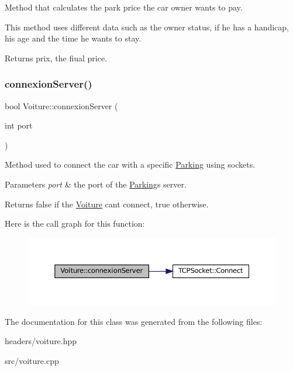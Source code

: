 Method that calculates the park price the car owner wants to pay. 

This method uses different data such as the owner status, if he has a handicap, his age and the time he wants to stay.

\begin{DoxyReturn}{Returns}
prix, the fiual price. 
\end{DoxyReturn}
\mbox{\label{class_voiture_abbc7a9f5a9e05a92b75623ff87bee85c}} 
\subsubsection{\texorpdfstring{connexion\+Server()}{connexionServer()}}
{\footnotesize\ttfamily bool Voiture\+::connexion\+Server (\begin{DoxyParamCaption}\item[{int}]{port }\end{DoxyParamCaption})}



Method used to connect the car with a specific \mbox{\hyperlink{class_parking}{Parking}} using sockets. 


\begin{DoxyParams}{Parameters}
{\em port} & the port of the \mbox{\hyperlink{class_parking}{Parking}}\textquotesingle{}s server. \\
\hline
\end{DoxyParams}
\begin{DoxyReturn}{Returns}
false if the \mbox{\hyperlink{class_voiture}{Voiture}} can\textquotesingle{}t connect, true otherwise. 
\end{DoxyReturn}
Here is the call graph for this function\+:
\nopagebreak
\begin{figure}[H]
\begin{center}
\leavevmode
\includegraphics[width=350pt]{class_voiture_abbc7a9f5a9e05a92b75623ff87bee85c_cgraph}
\end{center}
\end{figure}


The documentation for this class was generated from the following files\+:\begin{DoxyCompactItemize}
\item 
headers/voiture.\+hpp\item 
src/voiture.\+cpp\end{DoxyCompactItemize}
